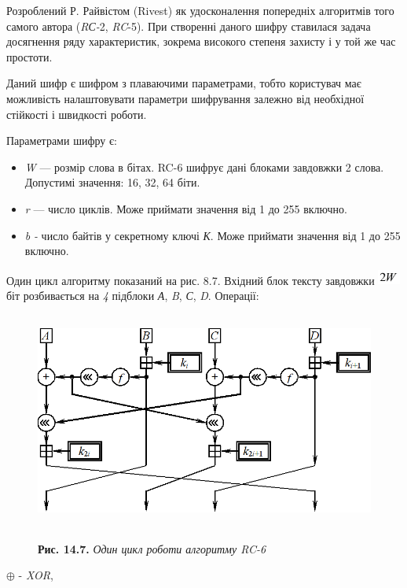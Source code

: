 \bigskip

Розроблений Р. Райвістом (Rivest) як удосконалення попередніх алгоритмів того
самого автора (\textit{R}\textit{С-}2, \textit{RC}{}-5). При створенні даного
шифру ставилася задача досягнення ряду характеристик, зокрема високого степеня
захисту і у той же час простоти.


\bigskip

Даний шифр є шифром з плаваючими параметрами, тобто користувач має можливість
налаштовувати параметри шифрування залежно від необхідної стійкості і швидкості
роботи.

Параметрами шифру є: 

\liststyleWWviiiNumxlii
\begin{itemize}
\item \textit{W }--- розмір слова в бітах. RC-6 шифрує дані блоками завдовжки 2
слова. Допустимі значення: 16, 32, 64 біти.
\item \textit{r }--- число циклів. Може приймати значення від 1 до 255 включно.
\item \textit{b}\textit{ }\textit{{}-}\textit{ }число байтів у секретному ключі
\textit{К}. Може приймати значення від 1 до 255 включно.
\end{itemize}
Один цикл алгоритму показаний на рис. 8.7. Вхідний блок тексту завдовжки 
\includegraphics[width=0.2917in,height=0.1937in]{crypt-img/crypt-img304.png} 
біт розбивається на \textit{4 }підблоки \textit{А}, \textit{B}, \textit{С},
\textit{D}. Операції:

\begin{figure}
\centering
\begin{minipage}{}
 \includegraphics[width=4.6146in,height=2.8071in]{crypt-img/crypt-img305.png} 
\end{minipage}
\end{figure}
\begin{figure}
\centering
\begin{minipage}{}
{\centering
\textbf{Рис. 14.7. }\textit{Один цикл роботи алгоритму RC-6}
\par}
\end{minipage}
\end{figure}
  ${\oplus}$  {}- \textit{XOR},

